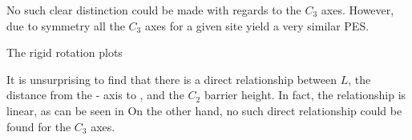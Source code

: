 No such clear distinction could be made with regards to the $C_3$ axes.
However, due to symmetry all the $C_3$ axes for a given site yield a very similar PES. 

The rigid rotation plots




It is unsurprising to find that there is a direct relationship between $L$, the distance from the - axis to , and the $C_2$ barrier height.
In fact, the relationship is linear, as can be seen in %
On the other hand, no such direct relationship could be found for the $C_3$ axes.

\incomplete
